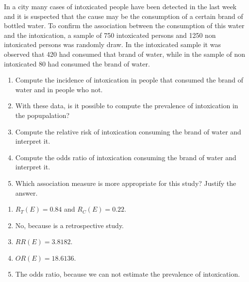 {In a city many cases of intoxicated people have been detected in the last week and it is suspected that the cause may be the consumption of a certain brand of bottled water.
To confirm the association between the consumption of this water and the intoxication, a sample of 750 intoxicated persons and 1250 non intoxicated persons was randomly draw.
In the intoxicated sample it was observed that 420 had consumed that brand of water, while in the sample of non intoxicated 80 had consumed the brand of water.

\begin{enumerate}
\item Compute the incidence of intoxication in people that consumed the brand of water and in people who not. 
\item With these data, is it possible to compute the prevalence of intoxication in the popupalation?
\item Compute the relative risk of intoxication consuming the brand of water and interpret it.
\item Compute the odds ratio of intoxication consuming the brand of water and interpret it.
\item Which association measure is more appropriate for this study? Justify the answer.
\end{enumerate}
}
{
\begin{enumerate}
\item $R_T(E)=0.84$ and $R_C(E)=0.22$.
\item No, because is a retrospective study.
\item $RR(E)=3.8182$.
\item $OR(E)=18.6136$.
\item The odds ratio, because we can not estimate the prevalence of intoxication.
\end{enumerate}
}
{
}

